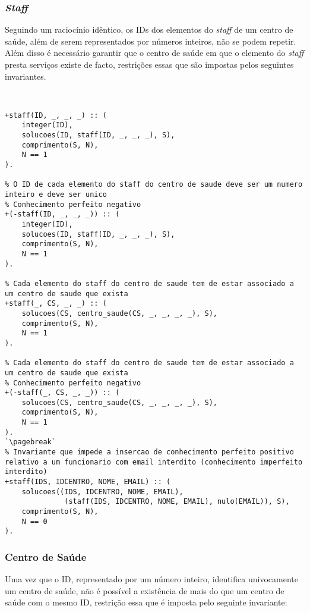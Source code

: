 \subsubsection*{\textit{Staff}}

Seguindo um raciocínio idêntico, os IDs dos elementos do \textit{staff} de um centro de saúde, além de serem representados
por números inteiros, não se podem repetir. Além disso é necessário garantir que o centro de saúde em que o elemento do
\textit{staff} presta serviços existe de facto, restrições essas que são impostas pelos seguintes invariantes.

\

\begin{lstlisting}[caption={Invariantes de inserção relativos ao predicado \texttt{staff}}]
% O ID de cada elemento do staff do centro de saude deve ser um numero inteiro e deve ser unico
+staff(ID, _, _, _) :: (
    integer(ID),
    solucoes(ID, staff(ID, _, _, _), S),
    comprimento(S, N),
    N == 1
).

% O ID de cada elemento do staff do centro de saude deve ser um numero inteiro e deve ser unico
% Conhecimento perfeito negativo
+(-staff(ID, _, _, _)) :: (
    integer(ID),
    solucoes(ID, staff(ID, _, _, _), S),
    comprimento(S, N),
    N == 1
).

% Cada elemento do staff do centro de saude tem de estar associado a um centro de saude que exista
+staff(_, CS, _, _) :: (
    solucoes(CS, centro_saude(CS, _, _, _, _), S),
    comprimento(S, N),
    N == 1
).

% Cada elemento do staff do centro de saude tem de estar associado a um centro de saude que exista
% Conhecimento perfeito negativo
+(-staff(_, CS, _, _)) :: (
    solucoes(CS, centro_saude(CS, _, _, _, _), S),
    comprimento(S, N),
    N == 1
).
`\pagebreak`
% Invariante que impede a insercao de conhecimento perfeito positivo relativo a um funcionario com email interdito (conhecimento imperfeito interdito)
+staff(IDS, IDCENTRO, NOME, EMAIL) :: (
    solucoes((IDS, IDCENTRO, NOME, EMAIL),
              (staff(IDS, IDCENTRO, NOME, EMAIL), nulo(EMAIL)), S),
    comprimento(S, N),
    N == 0
).

\end{lstlisting}

\subsubsection*{Centro de Saúde}
Uma vez que o ID, representado por um número inteiro, identifica univocamente um centro de saúde, não é possível a existência
de mais do que um centro de saúde com o mesmo ID, restrição essa que é imposta pelo seguinte invariante:

